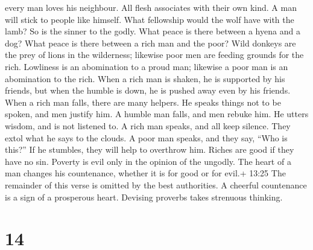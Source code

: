 every man loves his neighbour.  All flesh associates with
their own kind. A man will stick to people like himself. 
What fellowship would the wolf have with the lamb? So is the sinner to
the godly.  What peace is there between a hyena and a dog?
What peace is there between a rich man and the poor?  Wild
donkeys are the prey of lions in the wilderness; likewise poor men are
feeding grounds for the rich.  Lowliness is an abomination
to a proud man; likewise a poor man is an abomination to the rich.
 When a rich man is shaken, he is supported by his friends,
but when the humble is down, he is pushed away even by his friends.
 When a rich man falls, there are many helpers. He speaks
things not to be spoken, and men justify him. A humble man falls, and
men rebuke him. He utters wisdom, and is not listened to. 
A rich man speaks, and all keep silence. They extol what he says to the
clouds. A poor man speaks, and they say, ``Who is this?'' If he
stumbles, they will help to overthrow him.  Riches are good
if they have no sin. Poverty is evil only in the opinion of the ungodly.
 The heart of a man changes his countenance, whether it is
for good or for evil.+ 13:25 The remainder of this verse is omitted by
the best authorities.  A cheerful countenance is a sign of
a prosperous heart. Devising proverbs takes strenuous thinking.

\hypertarget{section-3}{%
\section{14}\label{section-3}}

